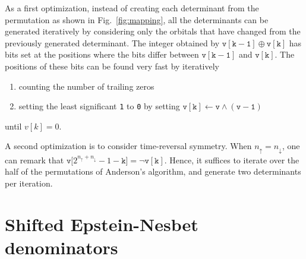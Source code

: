 \documentclass[aip,jcp,reprint,showkeys]{revtex4-1}
\newcommand{\up}{\uparrow}
\newcommand{\dn}{\downarrow}
\newcommand{\one}{{\texttt{1}}}
\newcommand{\zero}{{\texttt{0}}}
\begin{document}
As a first optimization, instead of creating each determinant from the
permutation as shown in Fig.~\ref{fig:mapping}, all the determinants can be
generated iteratively by considering only the orbitals that have changed
from the previously generated determinant.
The integer obtained by $\mathtt{v[k-1]} \oplus \mathtt{v[k]}$ has bits set at
the positions where the bits differ between $\mathtt{v[k-1]}$ and
$\mathtt{v[k]}$. The positions of these bits can be found very fast by
iteratively
\begin{enumerate}
\item counting the number of trailing zeros
\item setting the least significant {\one} to {\zero} by setting
      $\mathtt{v[k] \gets v \wedge (v-1)}$
\end{enumerate}
until $v[k] = 0$. 

A second optimization is to consider time-reversal symmetry. When $n_\up =
n_\dn$, one can remark that $\mathtt{v[}2^{n_\up+n_\dn}-1-\mathtt{k]} = \neg \mathtt{v[k]}$.
Hence, it suffices to iterate over the half of the permutations of Anderson's
algorithm, and generate two determinants per iteration.


\section{Shifted Epstein-Nesbet denominators}
\end{document}
